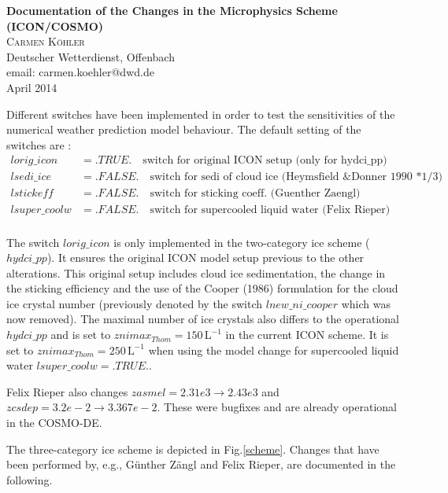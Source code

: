 \documentclass[a4paper,11pt]{article}
\begin{document}
 

\begin{center}
{\bfseries \LARGE Documentation of the Changes in the Microphysics Scheme (ICON/COSMO)} ~\\[5mm]

{\scshape Carmen K\"ohler} \\
{Deutscher Wetterdienst, Offenbach} \\
{email: carmen.koehler@dwd.de} \\[5mm]
{April 2014} \\
\end{center}

Different switches have been implemented in order to test the sensitivities of
the numerical weather prediction model behaviour. The default setting of the
switches are :
\begin{align} 
  lorig\_icon    &= .TRUE. \quad \text{switch for original ICON setup (only for hydci\_pp)}\\
  lsedi\_ice     &= .FALSE.\quad \text{switch for sedi of cloud ice (Heymsfield \& Donner 1990 *1/3)}\\
  lstickeff      &= .FALSE.\quad \text{switch for sticking coeff. (Guenther Zaengl)}\\
  lsuper\_coolw  &= .FALSE.\quad \text{switch for supercooled liquid water (Felix Rieper)}\\
\end{align}

The switch $lorig\_icon$ is only implemented in the two-category ice scheme
($hydci\_pp$). It ensures the original ICON model setup previous to the other
alterations. This original setup includes cloud ice sedimentation, the change
in the sticking efficiency and the use of the Cooper (1986) formulation for
the cloud ice crystal number (previously denoted by the switch
$lnew\_ni\_cooper$ which was now removed). The maximal number of ice crystals also differs
to the operational $hydci\_pp$ and is set to $znimax_{Thom} = 150
\,\text{L}^{-1} $ in the current ICON scheme. It is set to
$znimax_{Thom} = 250 \,\text{L}^{-1} $ when using the model change for supercooled liquid
water $lsuper\_coolw = .TRUE.$. 

Felix Rieper also changes $zasmel= 2.31e3 \rightarrow 2.43e3$ and  $ zcsdep =
3.2e-2 \rightarrow  3.367e-2$. These were bugfixes and are already operational
in the COSMO-DE. 

The three-category ice scheme is depicted in Fig.\ref{scheme}. Changes that
have been performed by, e.g., G\"unther Z\"angl and Felix Rieper, are
documented in the following. 
\end{document}

